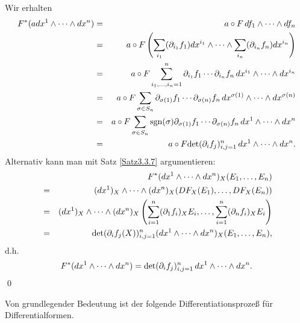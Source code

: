 \documentclass[a4paper,twoside,DIV15,BCOR12mm]{scrbook}
\DeclareMathOperator{\sgn}{sgn}
\begin{document}
 Wir erhalten
\begin{eqnarray*}
F^{*}(adx^{1} \wedge \dots \wedge dx^{n}) & = & a \circ F \, df_{1} 
\wedge \dots \wedge df_{n} \\
& = & a \circ F \left(\sum_{i_1}(\partial_{i_1}f_{1}) dx^{i_1} \wedge 
\dots \wedge \sum_{i_n}(\partial_{i_n} f_{n}) dx^{i_n}\right) \\
& = & a \circ F \sum_{i_{1},\dots,i_{n} = 1}^{n} \partial_{i_1} 
f_{1} \cdots \partial_{i_n} f_{n}\, dx^{i_1} \wedge \dots \wedge 
dx^{i_n} \\
& = & a \circ F \sum_{\sigma \in S_{n}} \partial_{\sigma(1)} f_{1} 
\cdots \partial_{\sigma(n)} f_{n} \, dx^{\sigma(1)} \wedge \dots 
\wedge dx^{\sigma(n)} \\
& = & a \circ F \sum_{\sigma \in S_{n}} \sgn (\sigma) 
\partial_{\sigma(1)} f_{1} \cdots \partial_{\sigma(n)} f_{n} \, 
dx^{1} \wedge \dots \wedge dx^{n} \\
& = & a \circ F {\rm det}(\partial_{i}f_{j})_{i,j=1}^{n} \, dx^{1} 
\wedge \dots \wedge dx^{n}.
\end{eqnarray*}
Alternativ kann man mit Satz \ref{Satz3.3.7} argumentieren:
\begin{eqnarray*}
&   & F^{*}(dx^{1} \wedge \dots \wedge dx^{n})_{X}(E_{1},\dots,E_{n}) 
\\
& = & (dx^{1})_{X} \wedge \dots \wedge 
(dx^{n})_{X}(DF_{X}(E_{1}),\dots,DF_{X}(E_{n})) \\
& = & (dx^{1})_{X} \wedge \dots \wedge (dx^{n})_{X} 
\left(\sum_{i=1}^{n}(\partial_{1} f_{i})_{X} 
E_{i},\dots,\sum_{i=1}^{n}(\partial_{n}f_{i})_{X}E_{i}\right) \\
& = & {\rm det}(\partial_{i}f_{j}(X))_{i,j=1}^{n} (dx^{1} \wedge 
\dots \wedge dx^{n})_{X}(E_{1},\dots,E_{n}),
\end{eqnarray*}
d.h.
\[ F^{*}(dx^{1} \wedge \dots \wedge dx^{n}) = {\rm 
det}(\partial_{i}f_{j})_{i,j=1}^{n} \, dx^{1} \wedge \dots \wedge 
dx^{n}. \]
\qed\\

\bigskip

\noindent
Von grundlegender Bedeutung ist der folgende Differentiationsprozeß 
für Differentialformen.

\bigskip
\end{document}
